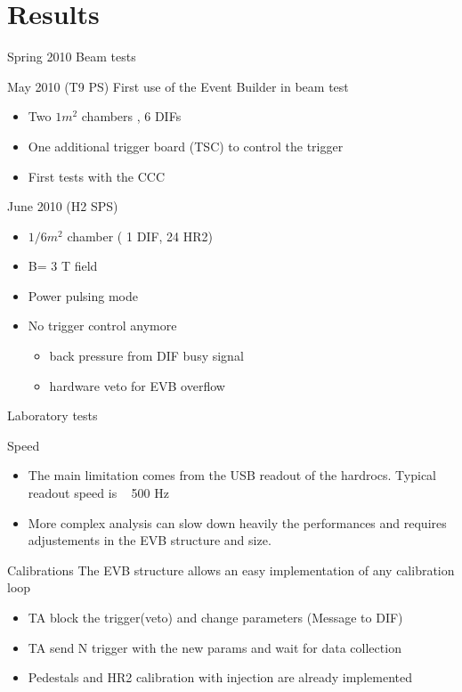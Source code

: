 \section{Results}
\begin{frame}{Spring 2010 Beam tests}
  \begin{block}{May 2010 (T9 PS)}
    First use of the Event Builder in beam test
    \begin{itemize}
    \item Two $1  m^2$ chambers , 6 DIFs
    \item One additional trigger board (TSC) to control the trigger
    \item First tests with the CCC 
    \end{itemize}
  \end{block}
  \pause \begin{block}{June 2010 (H2 SPS)}
    \begin{itemize}
    \item $1/6 m^2$ chamber ( 1 DIF, 24 HR2)
    \item B= 3 T field
    \item Power pulsing mode
    \item No trigger control anymore
      \begin{itemize}
      \item back pressure from DIF busy signal
      \item hardware veto for EVB overflow 
      \end{itemize}      
    \end{itemize}
  \end{block}
\end{frame}
\begin{frame}{Laboratory tests}
  \begin{block}{Speed}
    \begin{itemize}
    \item The main limitation comes from the USB readout of the hardrocs. Typical readout speed is ~ 500 Hz
    \item More complex analysis can slow down heavily the performances and requires adjustements in the EVB structure and size.
    \end{itemize}
  \end{block}
  \pause
  \begin{block}{Calibrations}
    The EVB structure allows an easy implementation of any calibration loop
    \begin{itemize}
    \item TA block the trigger(veto) and change parameters (Message to DIF)
    \item TA send N trigger with the new params and wait for data collection
    \item Pedestals and HR2 calibration with injection are already implemented 
    \end{itemize}
  \end{block}
\end{frame}

